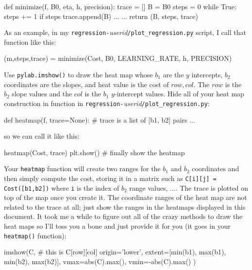 \documentclass[titlepage]{tufte-book}
\begin{document}
\begin{fullwidth}
\begin{pyverbatim}
def minimize(f, B0, eta, h, precision):
    trace = []
    B = B0
    steps = 0 
    while True:
        steps += 1
        if steps %
            trace.append(B)
        ...     
    ... 
    return (B, steps, trace)
\end{pyverbatim}

\noindent As an example, in my {\tt regression-}{\em userid}{\tt /plot\_regression.py} script, I call that function like this:

\begin{pyverbatim}
(m,steps,trace) = minimize(Cost, B0, LEARNING_RATE, h, PRECISION)
\end{pyverbatim}

Use {\tt pylab.imshow()} to draw the heat map whose $b_1$ are the $y$ intercepts, $b_2$ coordinates are the slopes, and heat value is the cost of $row,col$. The $row$ is the $b_2$ slope values and the $col$ is the $b_1$ $y$-intercept values. Hide all of your heat map construction in function in {\tt regression-}{\em userid}{\tt /plot\_regression.py}:

\begin{pyverbatim}
def heatmap(f, trace=None): # trace is a list of [b1, b2] pairs
    ...
\end{pyverbatim}

\noindent so we can call it like this:

\begin{pyverbatim}
heatmap(Cost, trace)
plt.show() # finally show the heatmap
\end{pyverbatim}

Your {\tt heatmap} function will create two ranges for the $b_1$ and $b_2$ coordinates and then simply compute the cost, storing it in a matrix such as {\tt C[i][j] = Cost([b1,b2])} where {\tt i} is the index of $b_2$ range values, ....  The trace is plotted on top of the map once you create it. The coordinate ranges of the heat map are not related to the trace at all; just show the ranges in the heatmaps displayed in this document. It took me a while to figure out all of the crazy methods to draw the heat maps so I'll toss you a bone and just provide it for you (it goes in your {\tt heatmap()} function):

\begin{pyverbatim}
	imshow(C,  # this is C[row][col]
		   origin='lower',
		   extent=[min(b1), max(b1), min(b2), max(b2)],
		   vmax=abs(C).max(), vmin=-abs(C).max()
	)
\end{pyverbatim}


\end{fullwidth}
\end{document}
